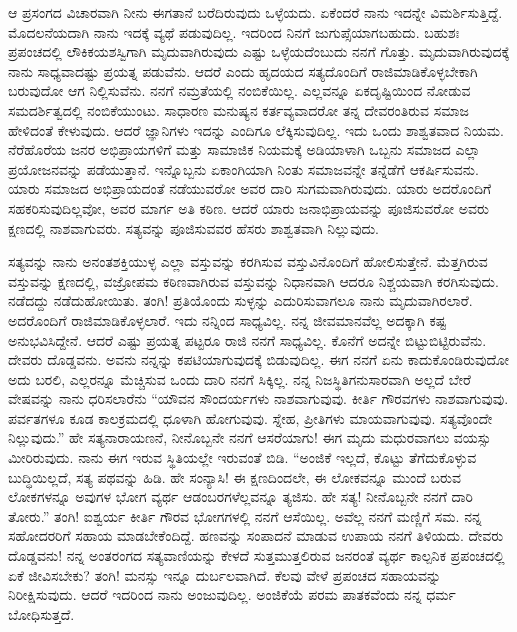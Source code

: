 ಆ ಪ್ರಸಂಗದ ವಿಚಾರವಾಗಿ ನೀನು ಈಗತಾನೆ ಬರೆದಿರುವುದು ಒಳ್ಳೆಯದು. ಏಕೆಂದರೆ ನಾನು ಇದನ್ನೇ ವಿಮರ್ಶಿಸುತ್ತಿದ್ದೆ. ಮೊದಲನೆಯದಾಗಿ ನಾನು ಇದಕ್ಕೆ ವ್ಯಥೆ ಪಡುವುದಿಲ್ಲ. ಇದರಿಂದ ನಿನಗೆ ಜುಗುಪ್ಸೆಯಾಗಬಹುದು. ಬಹುಶಃ ಪ್ರಪಂಚದಲ್ಲಿ ಲೌಕಿಕ\break ಯಶಸ್ವಿಗಾಗಿ ಮೃದುವಾಗಿರುವುದು ಎಷ್ಟು ಒಳ್ಳೆಯದೆಂಬುದು ನನಗೆ ಗೊತ್ತು. ಮೃದುವಾಗಿರುವುದಕ್ಕೆ ನಾನು ಸಾಧ್ಯವಾದಷ್ಟು ಪ್ರಯತ್ನ ಪಡುವೆನು. ಆದರೆ ಎಂದು ಹೃದಯದ ಸತ್ಯದೊಂದಿಗೆ ರಾಜಿಮಾಡಿಕೊಳ್ಳಬೇಕಾಗಿ ಬರುವುದೋ ಆಗ ನಿಲ್ಲಿಸುವೆನು. ನನಗೆ ನಮ್ರತೆಯಲ್ಲಿ ನಂಬಿಕೆಯಿಲ್ಲ. ಎಲ್ಲವನ್ನೂ ಏಕದೃಷ್ಟಿಯಿಂದ ನೋಡುವ ಸಮದರ್ಶಿತ್ವದಲ್ಲಿ ನಂಬಿಕೆಯುಂಟು. ಸಾಧಾರಣ ಮನುಷ್ಯನ ಕರ್ತವ್ಯವಾದರೋ ತನ್ನ ದೇವರಂತಿರುವ ಸಮಾಜ ಹೇಳಿದಂತೆ ಕೇಳುವುದು. ಆದರೆ ಜ್ಞಾನಿಗಳು ಇದನ್ನು ಎಂದಿಗೂ ಲೆಕ್ಕಿಸುವುದಿಲ್ಲ. ಇದು ಒಂದು ಶಾಶ್ವತವಾದ ನಿಯಮ. ನೆರೆಹೊರೆಯ ಜನರ ಅಭಿಪ್ರಾಯಗಳಿಗೆ ಮತ್ತು ಸಾಮಾಜಿಕ ನಿಯಮಕ್ಕೆ ಅಡಿಯಾಳಾಗಿ ಒಬ್ಬನು ಸಮಾಜದ ಎಲ್ಲಾ ಪ್ರಯೋಜನವನ್ನು ಪಡೆಯುತ್ತಾನೆ. ಇನ್ನೊಬ್ಬನು ಏಕಾಂಗಿಯಾಗಿ ನಿಂತು ಸಮಾಜವನ್ನೇ ತನ್ನೆಡೆಗೆ ಆಕರ್ಷಿಸುವನು. ಯಾರು ಸಮಾಜದ ಅಭಿಪ್ರಾಯದಂತೆ ನಡೆಯುವರೋ ಅವರ ದಾರಿ ಸುಗಮವಾಗಿರುವುದು. ಯಾರು ಅದರೊಂದಿಗೆ ಸಹಕರಿಸುವುದಿಲ್ಲವೋ, ಅವರ ಮಾರ್ಗ ಅತಿ ಕಠಿಣ. ಆದರೆ ಯಾರು ಜನಾಭಿಪ್ರಾಯವನ್ನು ಪೂಜಿಸುವರೋ ಅವರು ಕ್ಷಣದಲ್ಲಿ ನಾಶವಾಗುವರು. ಸತ್ಯವನ್ನು ಪೂಜಿಸುವವರ ಹೆಸರು ಶಾಶ್ವತವಾಗಿ ನಿಲ್ಲುವುದು.

ಸತ್ಯವನ್ನು ನಾನು ಅನಂತಶಕ್ತಿಯುಳ್ಳ ಎಲ್ಲಾ ವಸ್ತುವನ್ನು ಕರಗಿಸುವ ವಸ್ತುವಿನೊಂದಿಗೆ ಹೋಲಿಸುತ್ತೇನೆ. ಮೆತ್ತಗಿರುವ ವಸ್ತುವನ್ನು ಕ್ಷಣದಲ್ಲಿ, ವಜ್ರೋಪಮ ಕಠಿಣವಾಗಿರುವ ವಸ್ತುವನ್ನು ನಿಧಾನವಾಗಿ ಆದರೂ ನಿಶ್ಚಯವಾಗಿ ಕರಗಿಸುವುದು. ನಡೆದದ್ದು ನಡೆದುಹೋಯಿತು. ತಂಗಿ! ಪ್ರತಿಯೊಂದು ಸುಳ್ಳನ್ನು ಎದುರಿಸುವಾಗಲೂ ನಾನು ಮೃದುವಾಗಿರಲಾರೆ. ಅದರೊಂದಿಗೆ ರಾಜಿಮಾಡಿಕೊಳ್ಳಲಾರೆ. ಇದು ನನ್ನಿಂದ ಸಾಧ್ಯವಿಲ್ಲ. ನನ್ನ ಜೀವಮಾನವೆಲ್ಲ ಅದಕ್ಕಾಗಿ ಕಷ್ಟ ಅನುಭವಿಸಿದ್ದೇನೆ. ಆದರೆ ಎಷ್ಟು ಪ್ರಯತ್ನ ಪಟ್ಟರೂ ರಾಜಿ ನನಗೆ ಸಾಧ್ಯವಿಲ್ಲ. ಕೊನೆಗೆ ಅದನ್ನೇ ಬಿಟ್ಟುಬಿಟ್ಟಿರುವೆನು. ದೇವರು ದೊಡ್ಡವನು. ಅವನು ನನ್ನನ್ನು ಕಪಟಿಯಾಗುವುದಕ್ಕೆ ಬಿಡುವುದಿಲ್ಲ. ಈಗ ನನಗೆ ಏನು ಕಾದುಕೊಂಡಿರುವುದೋ ಅದು ಬರಲಿ, ಎಲ್ಲರನ್ನೂ ಮೆಚ್ಚಿಸುವ ಒಂದು ದಾರಿ ನನಗೆ ಸಿಕ್ಕಿಲ್ಲ. ನನ್ನ ನಿಜಸ್ಥಿತಿಗನುಸಾರವಾಗಿ ಅಲ್ಲದೆ ಬೇರೆ ವೇಷವನ್ನು ನಾನು ಧರಿಸಲಾರೆನು “ಯೌವನ ಸೌಂದರ್ಯಗಳು ನಾಶವಾಗುವುವು. ಕೀರ್ತಿ ಗೌರವಗಳು ನಾಶವಾಗುವುವು. ಪರ್ವತಗಳೂ ಕೂಡ ಕಾಲಕ್ರಮದಲ್ಲಿ ಧೂಳಾಗಿ ಹೋಗುವುವು. ಸ್ನೇಹ, ಪ್ರೀತಿಗಳು ಮಾಯವಾಗುವುವು. ಸತ್ಯವೊಂದೇ ನಿಲ್ಲುವುದು.” ಹೇ ಸತ್ಯನಾರಾಯಣನೆ, ನೀನೊಬ್ಬನೇ ನನಗೆ ಆಸರೆಯಾಗು! ಈಗ ಮೃದು ಮಧುರವಾಗಲು ವಯಸ್ಸು ಮೀರಿರುವುದು. ನಾನು ಈಗ ಇರುವ ಸ್ಥಿತಿಯಲ್ಲೇ ಇರುವಂತೆ ಬಿಡಿ. “ಅಂಜಿಕೆ ಇಲ್ಲದೆ, ಕೊಟ್ಟು ತೆಗೆದುಕೊಳ್ಳುವ ಬುದ್ಧಿಯಿಲ್ಲದೆ, ಸತ್ಯ ಪಥವನ್ನು ಹಿಡಿ. ಹೇ ಸಂನ್ಯಾಸಿ! ಈ ಕ್ಷಣದಿಂದಲೇ, ಈ ಲೋಕವನ್ನೂ ಮುಂದೆ ಬರುವ ಲೋಕಗಳನ್ನೂ ಅವುಗಳ ಭೋಗ ವ್ಯರ್ಥ ಆಡಂಬರಗಳೆಲ್ಲವನ್ನೂ ತ್ಯಜಿಸು. ಹೇ ಸತ್ಯ! ನೀನೊಬ್ಬನೇ ನನಗೆ ದಾರಿ ತೋರು.” ತಂಗಿ! ಐಶ್ವರ್ಯ ಕೀರ್ತಿ ಗೌರವ ಭೋಗಗಳಲ್ಲಿ ನನಗೆ ಆಸೆಯಿಲ್ಲ. ಅವೆಲ್ಲ ನನಗೆ ಮಣ್ಣಿಗೆ ಸಮ. ನನ್ನ ಸಹೋದರರಿಗೆ ಸಹಾಯ ಮಾಡಬೇಕೆಂದಿದ್ದೆ. ಹಣವನ್ನು ಸಂಪಾದನೆ ಮಾಡುವ ಉಪಾಯ ನನಗೆ ತಿಳಿಯದು. ದೇವರು ದೊಡ್ಡವನು! ನನ್ನ ಅಂತರಂಗದ ಸತ್ಯವಾಣಿಯನ್ನು ಕೇಳದೆ ಸುತ್ತಮುತ್ತಲಿರುವ ಜನರಂತೆ ವ್ಯರ್ಥ ಕಾಲ್ಪನಿಕ ಪ್ರಪಂಚದಲ್ಲಿ ಏಕೆ ಜೀವಿಸಬೇಕು? ತಂಗಿ! ಮನಸ್ಸು ಇನ್ನೂ ದುರ್ಬಲವಾಗಿದೆ. ಕೆಲವು ವೇಳೆ ಪ್ರಪಂಚದ ಸಹಾಯವನ್ನು ನಿರೀಕ್ಷಿಸುವುದು. ಆದರೆ ಇದರಿಂದ ನಾನು ಅಂಜುವುದಿಲ್ಲ. ಅಂಜಿಕೆಯೆ ಪರಮ ಪಾತಕವೆಂದು ನನ್ನ ಧರ್ಮ ಬೋಧಿಸುತ್ತದೆ.

